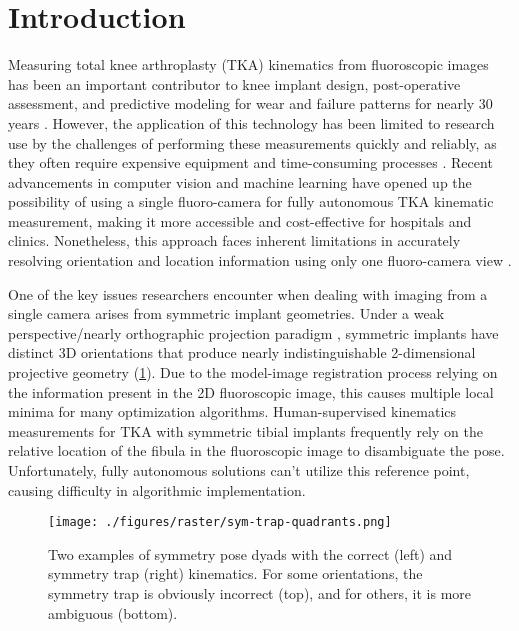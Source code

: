 \section{Introduction}
Measuring total knee arthroplasty (TKA) kinematics from fluoroscopic images has been an important contributor to knee implant design, post-operative assessment, and predictive modeling for wear and failure patterns for nearly 30 years \cite{banksRationaleResultsFixedBearing2019,banks2003HapPaul2004,freglyComputationalWearPrediction2005}.
However, the application of this technology has been limited to research use by the challenges of performing these measurements quickly and reliably, as they often require expensive equipment and time-consuming processes \cite{banksAccurateMeasurementThreedimensional1996,lafortuneThreedimensionalKinematicsHuman1992,zuffiModelbasedMethodReconstruction1999,mahfouzRobustMethodRegistration2003}.
Recent advancements in computer vision and machine learning have opened up the possibility of using a single fluoro-camera for fully autonomous TKA kinematic measurement\cite{brobergValidationMachineLearning2023,jensenJointTrackMachine2023}, making it more accessible and cost-effective for hospitals and clinics.
Nonetheless, this approach faces inherent limitations in accurately resolving orientation and location information using only one fluoro-camera view \cite{banksAccurateMeasurementThreedimensional1996,floodAutomatedRegistration3D2018,mahfouzRobustMethodRegistration2003,yamazakiImprovementDepthPosition2004,zuffiModelbasedMethodReconstruction1999}.

One of the key issues researchers encounter when dealing with imaging from a single camera arises from symmetric implant geometries.
Under a weak perspective/nearly orthographic projection paradigm \cite{szeliskiComputerVisionAlgorithms2022}, symmetric implants have distinct 3D orientations that produce nearly indistinguishable 2-dimensional projective geometry (\cref{fig:symmetry-trap-quadrants}).
Due to the model-image registration process relying on the information present in the 2D fluoroscopic image, this causes multiple local minima for many optimization algorithms.
Human-supervised kinematics measurements for TKA with symmetric tibial implants frequently rely on the relative location of the fibula in the fluoroscopic image to disambiguate the pose.
Unfortunately, fully autonomous solutions can’t utilize this reference point, causing difficulty in algorithmic implementation.

\begin{figure}[h!]
  \centering
  \texttt{[image: ./figures/raster/sym-trap-quadrants.png]}
  \caption{Two examples of symmetry pose dyads with the correct (left) and symmetry trap (right) kinematics. For some orientations, the symmetry trap is obviously incorrect (top), and for others, it is more ambiguous (bottom).}
  \label{fig:symmetry-trap-quadrants}
\end{figure}


